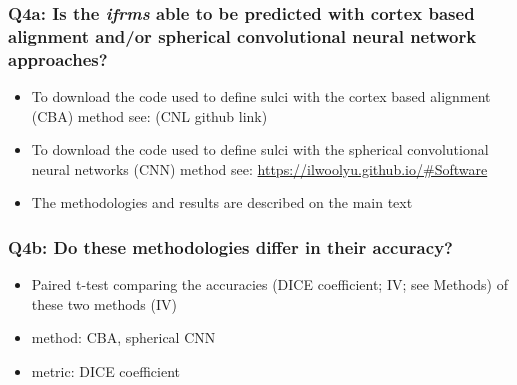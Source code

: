 \documentclass[
]{article}
\providecommand{\tightlist}{%
  \setlength{\itemsep}{0pt}\setlength{\parskip}{0pt}}
\begin{document}
\hypertarget{q4a-is-the-ifrms-able-to-be-predicted-with-cortex-based-alignment-andor-spherical-convolutional-neural-network-approaches}{%
\subsubsection{\texorpdfstring{Q4a: Is the \emph{ifrms} able to be
predicted with cortex based alignment and/or spherical convolutional
neural network
approaches?}{Q4a: Is the ifrms able to be predicted with cortex based alignment and/or spherical convolutional neural network approaches?}}\label{q4a-is-the-ifrms-able-to-be-predicted-with-cortex-based-alignment-andor-spherical-convolutional-neural-network-approaches}}

\begin{itemize}
\tightlist
\item
  To download the code used to define sulci with the cortex based
  alignment (CBA) method see: (CNL github link)
\item
  To download the code used to define sulci with the spherical
  convolutional neural networks (CNN) method see:
  \url{https://ilwoolyu.github.io/\#Software}
\item
  The methodologies and results are described on the main text
\end{itemize}

\hypertarget{q4b-do-these-methodologies-differ-in-their-accuracy}{%
\subsubsection{Q4b: Do these methodologies differ in their
accuracy?}\label{q4b-do-these-methodologies-differ-in-their-accuracy}}

\begin{itemize}
\tightlist
\item
  Paired t-test comparing the accuracies (DICE coefficient; IV; see
  Methods) of these two methods (IV)
\item
  method: CBA, spherical CNN
\item
  metric: DICE coefficient
\end{itemize}
\end{document}
